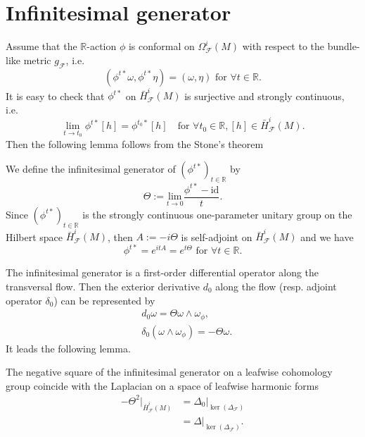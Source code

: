 \section{Infinitesimal generator}

Assume that the $\mathbb{R}$-action $\phi$ is conformal on $\Omega_{\mathcal{F}}^{i}(M)$ with respect to the bundle-like metric $g_{\mathcal{F}}$, i.e.
\begin{equation*}
    (\phi^{t*}\omega,\phi^{t*}\eta)=(\omega,\eta)\text{ for } \forall{t}\in\mathbb{R}.
\end{equation*}
It is easy to check that $\phi^{t*}$ on $\bar{H}^{i}_{\mathcal{F}}(M)$ is surjective and strongly continuous, i.e.
\begin{equation*}
    \lim_{t\rightarrow{t_{0}}}\phi^{t*}[h]=\phi^{t_{0}*}[h]\quad\text{for}\,\,\forall{t}_{0}\in\mathbb{R}, [h]\in\bar{H}^{i}_{\mathcal{F}}(M).
\end{equation*}
Then the following lemma follows from the Stone's theorem
\begin{lemma}\label{lem:1.3}
We define the infinitesimal generator of $(\phi^{t*})_{t\in\mathbb{R}}$ by
\begin{equation*}
    \Theta := \underset{t\rightarrow0}{\mathrm{lim}} \frac{\phi^{t*}- \mathrm{id}}{t}.
\end{equation*}
Since $(\phi^{t*})_{t\in\mathbb{R}}$ is the strongly continuous one-parameter unitary group on the Hilbert space $\bar{H}^{i}_{\mathcal{F}}(M)$,
then $A:=-i\Theta$ is self-adjoint on $\bar{H}^{i}_{\mathcal{F}}(M)$ and we have
\begin{equation*}
    \phi^{t*}=e^{itA}=e^{t\Theta}\text{ for }\forall{t}\in\mathbb{R}.
\end{equation*}
\end{lemma}
The infinitesimal generator is a first-order differential operator along the transversal flow.
Then the exterior derivative $d_{0}$ along the flow (resp. adjoint operator $\delta_{0}$) can be represented by
\begin{equation*}
\begin{split}
    & d_{0}\omega = \Theta\omega \wedge \omega_{\phi},\\
    & \delta_{0}(\omega \wedge \omega_{\phi}) = -\Theta\omega.
\end{split}
\end{equation*}
It leads the following lemma.
\begin{lemma}\label{lem:5.2}
The negative square of the infinitesimal generator on a leafwise cohomology group coincide with the Laplacian on a space of leafwise harmonic forms
\begin{equation*}
    \begin{split}
        -\Theta^{2}|_{\bar{H}_{\mathcal{F}}^{i}(M)} &= \Delta_{0}|_{\ker(\Delta_{\mathcal{F}})} \\
        &= \Delta|_{\ker(\Delta_{\mathcal{F}})}.
    \end{split}
\end{equation*}
\end{lemma}
